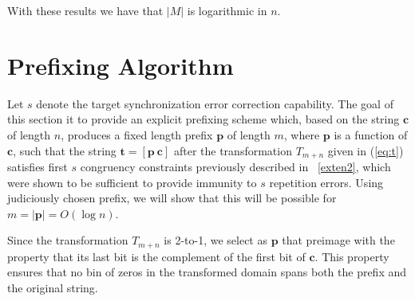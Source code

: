  With these results we have that
$|M|$ is logarithmic in $n$.


\section{Prefixing Algorithm}\label{enc}

Let $s$ denote the target synchronization error correction
capability. The goal of this section it to provide an explicit
prefixing  scheme which, based on the string $\mathbf{c}$ of
length $n$, produces a fixed length prefix $\mathbf{p}$ of length
$m$, where $\mathbf{p}$ is a function of $\mathbf{c}$, such that
the string $\mathbf{t}=[ \mathbf{p} ~ \mathbf{c} ]$ after the
transformation $T_{m+n}$ given in (\ref{eq:t}) satisfies first $s$
congruency constraints previously described  in ~\eqref{exten2},
which were shown to be sufficient to provide immunity to $s$
repetition errors. Using judiciously chosen prefix, we will show
that this will be possible for $m=|\mathbf{p}|=O(\log n)$. %

Since the transformation $T_{m+n}$ is 2-to-1, we select as
$\mathbf{p}$ that preimage with the property that its last bit is
the complement of the first bit of $\mathbf{c}$. This property
ensures that no bin of zeros in the transformed domain spans both
the prefix and the original string.







